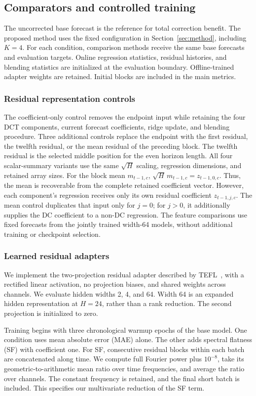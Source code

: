 \subsection{Comparators and controlled training}
The uncorrected base forecast is the reference for total correction benefit. The proposed method uses the fixed configuration in Section~\ref{sec:method}, including $K=4$. For each condition, comparison methods receive the same base forecasts and evaluation targets. Online regression statistics, residual histories, and blending statistics are initialized at the evaluation boundary. Offline-trained adapter weights are retained. Initial blocks are included in the main metrics.

\subsubsection{Residual representation controls}
The coefficient-only control removes the endpoint input while retaining the four DCT components, current forecast coefficients, ridge update, and blending procedure. Three additional controls replace the endpoint with the first residual, the twelfth residual, or the mean residual of the preceding block. The twelfth residual is the selected middle position for the even horizon length. All four scalar-summary variants use the same $\sqrt H$ scaling, regression dimensions, and retained array sizes. For the block mean $m_{t-1,c}$, $\sqrt H\,m_{t-1,c}=z_{t-1,0,c}$. Thus, the mean is recoverable from the complete retained coefficient vector. However, each component's regression receives only its own residual coefficient $z_{t-1,j,c}$. The mean control duplicates that input only for $j=0$; for $j>0$, it additionally supplies the DC coefficient to a non-DC regression. The feature comparisons use fixed forecasts from the jointly trained width-64 models, without additional training or checkpoint selection.

\subsubsection{Learned residual adapters}
We implement the two-projection residual adapter described by TEFL~\cite{tefl2026}, with a rectified linear activation, no projection biases, and shared weights across channels. We evaluate hidden widths 2, 4, and 64. Width 64 is an expanded hidden representation at $H=24$, rather than a rank reduction. The second projection is initialized to zero.

Training begins with three chronological warmup epochs of the base model. One condition uses mean absolute error (MAE) alone. The other adds spectral flatness (SF) with coefficient one. For SF, consecutive residual blocks within each batch are concatenated along time. We compute full Fourier power plus $10^{-8}$, take its geometric-to-arithmetic mean ratio over time frequencies, and average the ratio over channels. The constant frequency is retained, and the final short batch is included. This specifies our multivariate reduction of the SF term.

